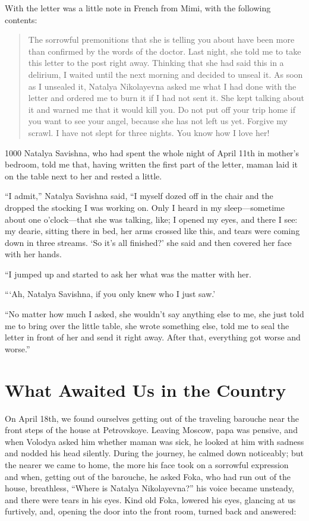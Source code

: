 With the letter was a little note in French from Mimi, with the following contents:

\begin{quotation}
The sorrowful premonitions that she is telling you about have been more than confirmed by the words of the doctor. Last night, she told me to take this letter to the post right away. Thinking that she had said this in a delirium, I waited until the next morning and decided to unseal it. As soon as I unsealed it, Natalya Nikolayevna asked me what I had done with the letter and ordered me to burn it if I had not sent it. She kept talking about it and warned me that it would kill you. Do not put off your trip home if you want to see your angel, because she has not left us yet. Forgive my scrawl. I have not slept for three nights. You know how I love her!
\end{quotation}

\begin{tolerant}{1000}
Natalya Savishna, who had spent the whole night of April 11th in mother's bedroom, told me that, having written the first part of the letter, maman laid it on the table next to her and rested a little.
\end{tolerant}

``I admit,'' Natalya Savishna said, ``I myself dozed off in the chair and the dropped the stocking I was working on. Only I heard in my sleep---sometime about one o'clock---that she was talking, like; I opened my eyes, and there I see: my dearie, sitting there in bed, her arms crossed like this, and tears were coming down in three streams. `So it's all finished?' she said and then covered her face with her hands. %

``I jumped up and started to ask her what was the matter with her. %

```Ah, Natalya Savishna, if you only knew who I just saw.' %

``No matter how much I asked, she wouldn't say anything else to me, she just told me to bring over the little table, she wrote something else, told me to seal the letter in front of her and send it right away. After that, everything got worse and worse.'' %

\chapter{What Awaited Us in the Country} %

On April 18th, we found ourselves getting out of the traveling barouche near the front steps of the house at Petrovskoye. Leaving Moscow, papa was pensive, and when Volodya asked him whether maman was sick, he looked at him with sadness and nodded his head silently. During the journey, he calmed down noticeably; but the nearer we came to home, the more his face took on a sorrowful expression and when, getting out of the barouche, he asked Foka, who had run out of the house, breathless, ``Where is Natalya Nikolayevna?'' his voice became unsteady, and there were tears in his eyes. Kind old Foka, lowered his eyes, glancing at us furtively, and, opening the door into the front room, turned back and answered:

